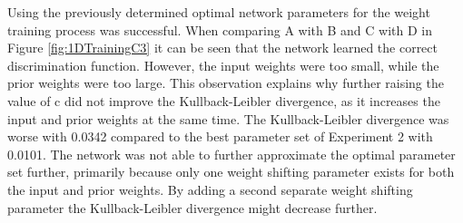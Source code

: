 Using the previously determined optimal network parameters for the weight training process was successful. When comparing A with B and C with D in Figure \ref{fig:1DTrainingC3} it can be seen that the network learned the correct discrimination function. However, the input weights were too small, while the prior weights were too large. This observation explains why further raising the value of c did not improve the Kullback-Leibler divergence, as it increases the input and prior weights at the same time. The Kullback-Leibler divergence was worse with 0.0342 compared to the best parameter set of Experiment 2 with 0.0101. The network was not able to further approximate the optimal parameter set further, primarily because only one weight shifting parameter exists for both the input and prior weights. By adding a second separate weight shifting parameter the Kullback-Leibler divergence might decrease further.